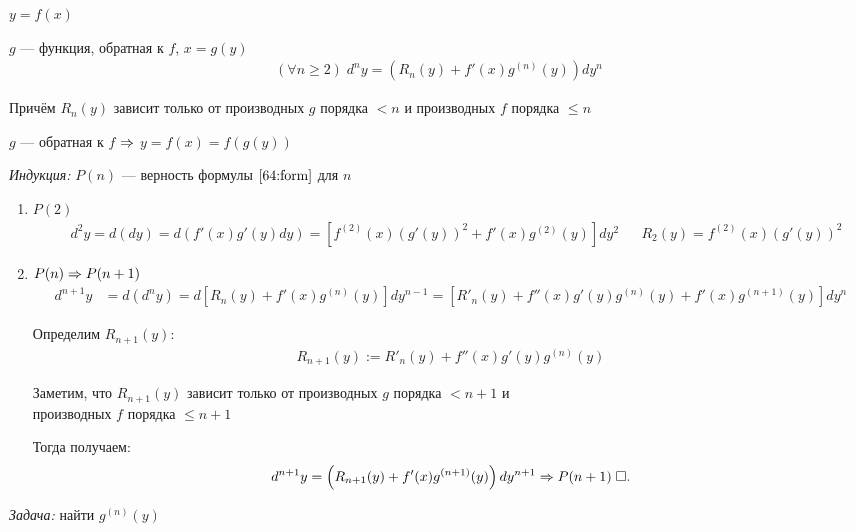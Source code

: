 \documentclass{article}
\begin{document}

\theorem

$y=f(x)$

$g$ --- функция, обратная к $f$, $x=g(y)$
\begin{align}
	(\forall n\geq 2)\;d^{n}y=\left(R_{n}(y)+f'(x)g^{(n)}(y)\right)dy^{n}\label{64:form}
\end{align}

Причём $R_{n}(y)$ зависит только от производных $g$ порядка $<n$ и производных $f$ порядка $\leq n$

\proof

$g$ --- обратная к $f$ $\Rightarrow$ $y=f(x)=f(g(y))$

{\it Индукция:} $P(n)$ --- верность формулы $\eqref{64:form}$ для $n$
\begin{enumerate}
	\item{}$P(2)$
	\begin{align*}
		 & d^{2}y=d(dy)=d(f'(x)g'(y)dy)=\left[f^{(2)}(x)(g'(y))^{2}+f'(x)g^{(2)}(y)\right]dy^{2} &  & R_2(y)=f^{(2)}(x)(g'(y))^{2}
	\end{align*}
	\item{}$P(n)\Rightarrow P(n+1)$
	\begin{align*}
		d^{n+1}y & =d(d^{n}y)=d\left[R_{n}(y)+f'(x)g^{(n)}(y)\right]dy^{n-1}= \left[R'_{n}(y)+f''(x)g'(y)g^{(n)}(y)+f'(x)g^{(n+1)}(y)\right]dy^{n}
	\end{align*}

	Определим $R_{n+1}(y)$:
	\begin{align*}
		R_{n+1}(y):=R'_{n}(y)+f''(x)g'(y)g^{(n)}(y)
	\end{align*}

	Заметим, что $R_{n+1}(y)$ зависит только от производных $g$ порядка $<n+1$ и\\
	производных $f$ порядка $\leq n+1$

	Тогда получаем:
	\begin{align*}
		d^{n+1}y=\left(R_{n+1}(y)+f'(x)g^{(n+1)}(y)\right)dy^{n+1}\Rightarrow P(n+1)\;\square.
	\end{align*}
\end{enumerate}


{\it Задача:} найти $g^{(n)}(y)$
\end{document}
